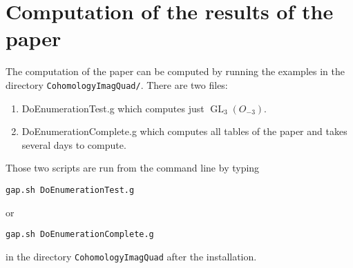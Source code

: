 \documentclass[12pt]{amsart}
\DeclareMathOperator{\GL}{GL}
\begin{document}
\section{Computation of the results of the paper}

The computation of the paper can be computed by running the examples in the directory {\tt CohomologyImagQuad/}.
There are two files:
\begin{enumerate}
\item DoEnumerationTest.g which computes just $\GL_3(O_{-3})$.
\item DoEnumerationComplete.g which computes all tables of the paper and takes several days to compute.
\end{enumerate}
Those two scripts are run from the command line by typing
\begin{verbatim}
gap.sh DoEnumerationTest.g
\end{verbatim}
or
\begin{verbatim}
gap.sh DoEnumerationComplete.g
\end{verbatim}
in the directory {\tt CohomologyImagQuad} after the installation.
\end{document}
